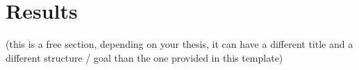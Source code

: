 \section{Results}
\label{sec::results}

(this is a free section, depending on your thesis, it can have a different title and a different structure / goal than the one provided in this template)